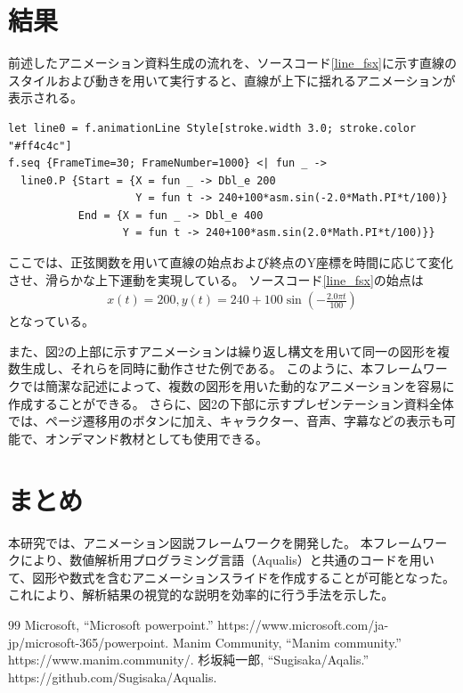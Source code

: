 \documentclass[twocolumn, a4paper]{ltjsarticle}
\begin{document}
\section{結果}
前述したアニメーション資料生成の流れを、ソースコード\ref{line_fsx}に示す直線のスタイルおよび動きを用いて実行すると、直線が上下に揺れるアニメーションが表示される。
\begin{lstlisting}[caption={直線のアニメーション},label={line_fsx},breaklines=true,breakatwhitespace=false]
let line0 = f.animationLine Style[stroke.width 3.0; stroke.color "#ff4c4c"]
f.seq {FrameTime=30; FrameNumber=1000} <| fun _ ->
  line0.P {Start = {X = fun _ -> Dbl_e 200
                    Y = fun t -> 240+100*asm.sin(-2.0*Math.PI*t/100)}
           End = {X = fun _ -> Dbl_e 400
                  Y = fun t -> 240+100*asm.sin(2.0*Math.PI*t/100)}}
\end{lstlisting}
ここでは、正弦関数を用いて直線の始点および終点のY座標を時間に応じて変化させ、滑らかな上下運動を実現している。
ソースコード\ref{line_fsx}の始点は
\begin{align}
x(t) = 200, y(t) = 240 + 100\sin\left(-\frac{2.0\pi t}{100}\right)
\end{align}
となっている。
\par
また、図2の上部に示すアニメーションは繰り返し構文を用いて同一の図形を複数生成し、それらを同時に動作させた例である。
このように、本フレームワークでは簡潔な記述によって、複数の図形を用いた動的なアニメーションを容易に作成することができる。
さらに、図2の下部に示すプレゼンテーション資料全体では、ページ遷移用のボタンに加え、キャラクター、音声、字幕などの表示も可能で、オンデマンド教材としても使用できる。

\section{まとめ}
本研究では、アニメーション図説フレームワークを開発した。
本フレームワークにより、数値解析用プログラミング言語（Aqualis）と共通のコードを用いて、図形や数式を含むアニメーションスライドを作成することが可能となった。
これにより、解析結果の視覚的な説明を効率的に行う手法を示した。

\begin{thebibliography}{99}
     Microsoft, ``Microsoft powerpoint.'' https://www.microsoft.com/ja-jp/microsoft-365/powerpoint.
     {Manim Community}, ``Manim community.'' https://www.manim.community/.
     杉坂純一郎, ``{Sugisaka/Aqalis}.'' https://github.com/Sugisaka/Aqualis.
\end{thebibliography}
\end{document}
